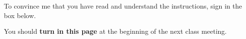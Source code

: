 \documentclass[11pt]{article}
\begin{document}
\bigskip

\noindent To convince me that you have read and understand the instructions, sign in the box below.

\bigskip

\begin{center}

\end{center}

\bigskip

\noindent You should \textbf{turn in this page} at the beginning of the next class meeting.
\end{document}
